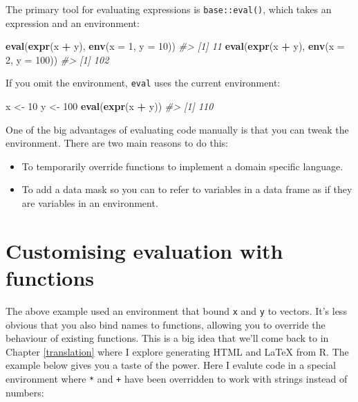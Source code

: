\documentclass[]{book}
\newenvironment{Shaded}{\begin{snugshade}}{\end{snugshade}}
\newcommand{\CommentTok}[1]{\textcolor[rgb]{0.37,0.37,0.37}{\textit{#1}}}
\newcommand{\DataTypeTok}[1]{\textcolor[rgb]{0.27,0.27,0.27}{#1}}
\newcommand{\DecValTok}[1]{\textcolor[rgb]{0.06,0.06,0.06}{#1}}
\newcommand{\KeywordTok}[1]{\textcolor[rgb]{0.27,0.27,0.27}{\textbf{#1}}}
\newcommand{\NormalTok}[1]{#1}
\newcommand{\OperatorTok}[1]{\textcolor[rgb]{0.43,0.43,0.43}{\textbf{#1}}}
\newcommand{\StringTok}[1]{\textcolor[rgb]{0.5,0.5,0.5}{#1}}
\providecommand{\tightlist}{%
  \setlength{\itemsep}{0pt}\setlength{\parskip}{0pt}}
\begin{document}
The primary tool for evaluating expressions is \texttt{base::eval()}, which takes an expression and an environment:

\begin{Shaded}
\begin{Highlighting}[]
\KeywordTok{eval}\NormalTok{(}\KeywordTok{expr}\NormalTok{(x }\OperatorTok{+}\StringTok{ }\NormalTok{y), }\KeywordTok{env}\NormalTok{(}\DataTypeTok{x =} \DecValTok{1}\NormalTok{, }\DataTypeTok{y =} \DecValTok{10}\NormalTok{))}
\CommentTok{#> [1] 11}
\KeywordTok{eval}\NormalTok{(}\KeywordTok{expr}\NormalTok{(x }\OperatorTok{+}\StringTok{ }\NormalTok{y), }\KeywordTok{env}\NormalTok{(}\DataTypeTok{x =} \DecValTok{2}\NormalTok{, }\DataTypeTok{y =} \DecValTok{100}\NormalTok{))}
\CommentTok{#> [1] 102}
\end{Highlighting}
\end{Shaded}

If you omit the environment, \texttt{eval} uses the current environment:

\begin{Shaded}
\begin{Highlighting}[]
\NormalTok{x <-}\StringTok{ }\DecValTok{10}
\NormalTok{y <-}\StringTok{ }\DecValTok{100}
\KeywordTok{eval}\NormalTok{(}\KeywordTok{expr}\NormalTok{(x }\OperatorTok{+}\StringTok{ }\NormalTok{y))}
\CommentTok{#> [1] 110}
\end{Highlighting}
\end{Shaded}

One of the big advantages of evaluating code manually is that you can tweak the environment. There are two main reasons to do this:

\begin{itemize}
\tightlist
\item
  To temporarily override functions to implement a domain specific language.
\item
  To add a data mask so you can to refer to variables in a data frame as if
  they are variables in an environment.
\end{itemize}

\hypertarget{eval-funs}{%
\section{Customising evaluation with functions}\label{eval-funs}}

The above example used an environment that bound \texttt{x} and \texttt{y} to vectors. It's less obvious that you also bind names to functions, allowing you to override the behaviour of existing functions. This is a big idea that we'll come back to in Chapter \ref{translation} where I explore generating HTML and LaTeX from R. The example below gives you a taste of the power. Here I evalute code in a special environment where \texttt{*} and \texttt{+} have been overridden to work with strings instead of numbers:
\end{document}
